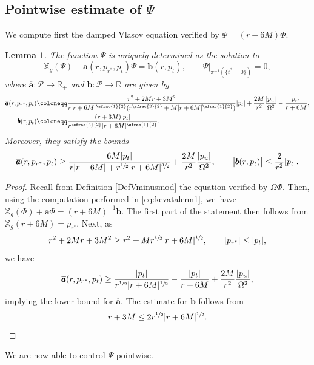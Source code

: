 \documentclass[10pt]{amsart}
\theoremstyle{plain}
\newtheorem{lemma}[proposition]{Lemma}
\theoremstyle{definition}
\newcommand\R{{\mathbb{R}}}
\newcommand\T{{\mathbb{X}}}
\begin{document}
\subsection{Pointwise estimate of $\Psi$}

We compute first the damped Vlasov equation verified by $\Psi =(r+6M)\Phi$.

\begin{lemma}\label{LembasicPsi}
The function $\Psi$ is uniquely determined as the solution to
\begin{equation*}
\T_g (\Psi)+ \overline{\pmb{a}} (r,p_{r^*},p_t) \Psi= \pmb{b}(r,p_t),\qquad \Psi\vert_{\pi^{-1}(\{t^*=0\})} =0,
\end{equation*}
where $\overline{\pmb{a}} \colon \mathcal{P} \to \R_+$ and $\pmb{b} \colon \mathcal{P} \to \R$ are given by
\begin{align*}
\overline{\pmb{a}}(r,p_{r^*},p_t) & \coloneqq \frac{r^2+2Mr+3M^2}{r|r+6M|^{\sfrac{1}{2}}(r^{\sfrac{3}{2}}+M|r+6M|^{\sfrac{1}{2}}) }|p_t| +\frac{2M}{r^2}\frac{|p_u|}{\Omega^2}-\frac{p_{r^*}}{r+6M}, \\
\pmb{b}(r,p_t) & \coloneqq \frac{(r+3M)|p_t|}{r^{\sfrac{5}{2}}|r+6M|^{\sfrac{1}{2}} }.
\end{align*}
Moreover, they satisfy the bounds
\[
\overline{\pmb{a}}(r,p_{r^*},p_t) \geq \frac{6M |p_t|}{r|r+6M|+r^{\sfrac{1}{2}} |r+6M|^{\sfrac{3}{2}} } + \frac{2M}{r^2}\frac{|p_u|}{\Omega^2}, \qquad \big|\pmb{b}(r,p_t) \big| \leq \frac{2}{r^2}|p_t|.
\]
\end{lemma}
\begin{proof}
Recall from Definition \ref{DefVminusmod} the equation verified by $\Omega\Phi$. Then, using the computation performed in \eqref{eq:kevatalenn1}, we~have $\T_g(\Phi)+\pmb{a} \Phi=(r+6M)^{-1} \pmb{b}$. The first part of the statement then follows from $\T_g(r+6M)=p_{r^*}$. Next, as
\[r^2+2Mr+3M^2 \geq r^{2}+Mr^{\sfrac{1}{2}}|r+6M|^{\sfrac{1}{2}}, \qquad |p_{r^*}| \leq |p_t|,
\]
we have
\[
\overline{\pmb{a}}(r,p_{r^*},p_t) \geq \frac{|p_t|}{r^{\sfrac{1}{2}} |r+6M|^{\sfrac{1}{2}} }-\frac{|p_t|}{r+6M} + \frac{2M}{r^2}\frac{|p_u|}{\Omega^2},
\]
implying the lower bound for $\overline{\pmb{a}}$. The estimate for $\pmb{b}$ follows from
\[r+3M \leq 2r^{\sfrac{1}{2}}|r+6M|^{\sfrac{1}{2}}.\qedhere
\]
\end{proof}

We are now able to control $\Psi$ pointwise.
\end{document}
